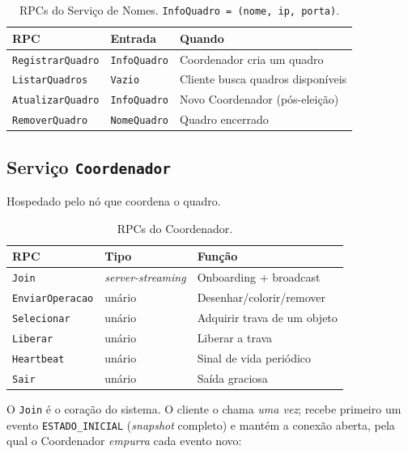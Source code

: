 \begin{table}[H]
  \centering
  \begin{tabular}{@{}lll@{}}
    \toprule
    \textbf{RPC} & \textbf{Entrada} & \textbf{Quando} \\
    \midrule
    \texttt{RegistrarQuadro} & \texttt{InfoQuadro} & Coordenador cria um quadro \\
    \texttt{ListarQuadros}   & \texttt{Vazio}      & Cliente busca quadros disponíveis \\
    \texttt{AtualizarQuadro} & \texttt{InfoQuadro} & Novo Coordenador (pós-eleição) \\
    \texttt{RemoverQuadro}   & \texttt{NomeQuadro} & Quadro encerrado \\
    \bottomrule
  \end{tabular}
  \caption{RPCs do Serviço de Nomes. \texttt{InfoQuadro = (nome, ip, porta)}.}
\end{table}

\subsection{Serviço \texttt{Coordenador}}

Hospedado pelo nó que coordena o quadro.

\begin{table}[H]
  \centering
  \begin{tabular}{@{}lll@{}}
    \toprule
    \textbf{RPC} & \textbf{Tipo} & \textbf{Função} \\
    \midrule
    \texttt{Join}           & \emph{server-streaming} & Onboarding + broadcast \\
    \texttt{EnviarOperacao} & unário & Desenhar/colorir/remover \\
    \texttt{Selecionar}     & unário & Adquirir trava de um objeto \\
    \texttt{Liberar}        & unário & Liberar a trava \\
    \texttt{Heartbeat}      & unário & Sinal de vida periódico \\
    \texttt{Sair}           & unário & Saída graciosa \\
    \bottomrule
  \end{tabular}
  \caption{RPCs do Coordenador.}
\end{table}

O \texttt{Join} é o coração do sistema. O cliente o chama \emph{uma vez}; recebe primeiro
um evento \texttt{ESTADO\_INICIAL} (\emph{snapshot} completo) e mantém a conexão aberta,
pela qual o Coordenador \emph{empurra} cada evento novo:

